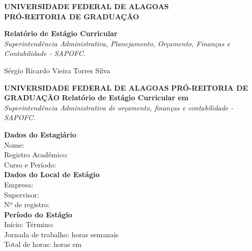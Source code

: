 \documentclass[12pt,a4paper]{article}
\begin{document}
	
	\begin{titlepage}
		\centering
		\large
		\textbf{UNIVERSIDADE FEDERAL DE ALAGOAS} \\
		\textbf{PRÓ-REITORIA DE GRADUAÇÃO} \\
		\vfill
		
		\Huge \textbf{Relatório de Estágio Curricular} \\
		\vspace{0.5cm}
		\LARGE \textit{Superintendência Administrativa, Planejamento, Orçamento, Finanças e Contabilidade - SAPOFC.} \\
		\vfill
		
		\Large Sérgio Ricardo Vieira Torres Silva \\
		\vspace{1.5cm}
	\end{titlepage}
	
	\thispagestyle{empty}
	\begin{center}
		\textbf{UNIVERSIDADE FEDERAL DE ALAGOAS} 
		\textbf{PRÓ-REITORIA DE GRADUAÇÃO} 
		\vspace{1cm}
		\textbf{Relatório de Estágio Curricular em} \\
		\textit{Superintendência Administrativa de orçamento, finanças e contabilidade - SAPOFC.}
	\end{center}
	
	\vspace{1cm}
	
	\noindent \textbf{Dados do Estagiário} \\
	Nome: \underline{\hspace{12cm}} \\
	Registro Acadêmico: \underline{\hspace{10cm}} \\
	Curso e Período: \underline{\hspace{10cm}} \\
	
	\vspace{0.5cm}
	\noindent \textbf{Dados do Local de Estágio} \\
	Empresa: \underline{\hspace{13cm}} \\
	Supervisor: \underline{\hspace{12cm}} \\
	Nº de registro: \underline{\hspace{10cm}} \\
	
	\vspace{0.5cm}
	\noindent \textbf{Período do Estágio} \\
	Início: \underline{\hspace{4cm}} \quad Término: \underline{\hspace{4cm}} \\
	Jornada de trabalho: \underline{\hspace{5cm}} horas semanais \\
	Total de horas: \underline{\hspace{4cm}} horas em \underline{\hspace{6cm}} \\
	
\end{document}

